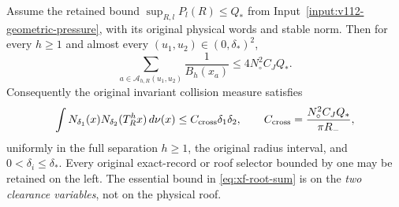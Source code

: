 \begin{theorem}
\label{thm:xf-pressure}
Assume the retained bound $\sup_{R,l}P_l(R)\le Q_*$ from
Input~\ref{input:v112-geometric-pressure}, with its original
physical words and stable norm. Then for every $h\ge1$ and almost
every $(u_1,u_2)\in(0,\delta_*)^2$,
\begin{equation}\label{eq:xf-root-sum}
 \sum_{a\in\mathcal A_{h,R}(u_1,u_2)}\frac1{B_h(x_a)}
                       \le4N_\circ^2C_JQ_*.
\end{equation}
Consequently the original invariant collision measure satisfies
\begin{equation}\label{eq:xf-pair-bound}
 \int N_{\delta_1}(x)N_{\delta_2}(T_R^hx)\,d\nu(x)
        \le C_{\rm cross}\delta_1\delta_2,
 \qquad C_{\rm cross}=\frac{N_\circ^2C_JQ_*}{\pi R_-},
\end{equation}
uniformly in the full separation $h\ge1$, the original radius
interval, and $0<\delta_i\le\delta_*$. Every original exact-record
or roof selector bounded by one may be retained on the left. The
essential bound in \eqref{eq:xf-root-sum} is on the \emph{two
clearance variables}, not on the physical roof.
\end{theorem}
